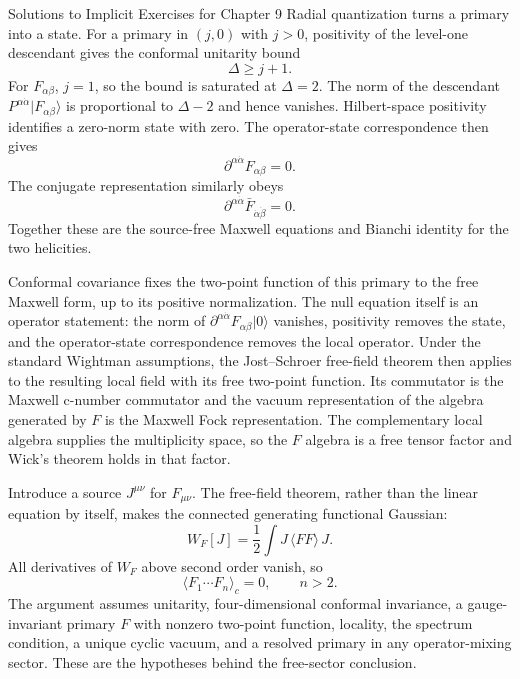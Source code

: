 \begin{bankssolutions}{Solutions to Implicit Exercises for Chapter 9}
Radial quantization turns a primary into a state.  For a primary in $(j,0)$
with $j>0$, positivity of the level-one descendant gives the conformal
unitarity bound
\[
  \Delta\geq j+1.
\]
For $F_{\alpha\beta}$, $j=1$, so the bound is saturated at $\Delta=2$.
The norm of the descendant
$P^{\alpha\dot\alpha}|F_{\alpha\beta}\rangle$ is proportional to
$\Delta-2$ and hence vanishes.  Hilbert-space positivity identifies a
zero-norm state with zero.  The operator-state correspondence then gives
\[
  \partial^{\alpha\dot\alpha}F_{\alpha\beta}=0.
\]
The conjugate representation similarly obeys
\[
  \partial^{\alpha\dot\alpha}\bar F_{\dot\alpha\dot\beta}=0.
\]
Together these are the source-free Maxwell equations and Bianchi identity for
the two helicities.

Conformal covariance fixes the two-point function of this primary to the free
Maxwell form, up to its positive normalization.  The null equation itself is
an operator statement: the norm of
$\partial^{\alpha\dot\alpha}F_{\alpha\beta}|0\rangle$ vanishes, positivity
removes the state, and the operator-state correspondence removes the local
operator.  Under the standard Wightman assumptions, the Jost--Schroer
free-field theorem then applies to the resulting local field with its free
two-point function.  Its commutator is the Maxwell c-number commutator and the
vacuum representation of the algebra generated by $F$ is the Maxwell Fock
representation.  The complementary local algebra supplies the multiplicity
space, so the $F$ algebra is a free tensor factor and Wick's theorem holds in
that factor.

Introduce a source $J^{\mu\nu}$ for $F_{\mu\nu}$.  The free-field theorem,
rather than the linear equation by itself, makes the connected generating
functional Gaussian:
\[
  W_F[J]=\frac12\int J\,\langle FF\rangle\,J.
\]
All derivatives of $W_F$ above second order vanish, so
\[
  \langle F_1\cdots F_n\rangle_{\!c}=0,
  \qquad n>2.
\]
The argument assumes unitarity, four-dimensional conformal invariance, a
gauge-invariant primary $F$ with nonzero two-point function, locality, the
spectrum condition, a unique cyclic vacuum, and a resolved primary in any
operator-mixing sector.  These are the hypotheses behind the free-sector
conclusion.


\end{bankssolutions}
